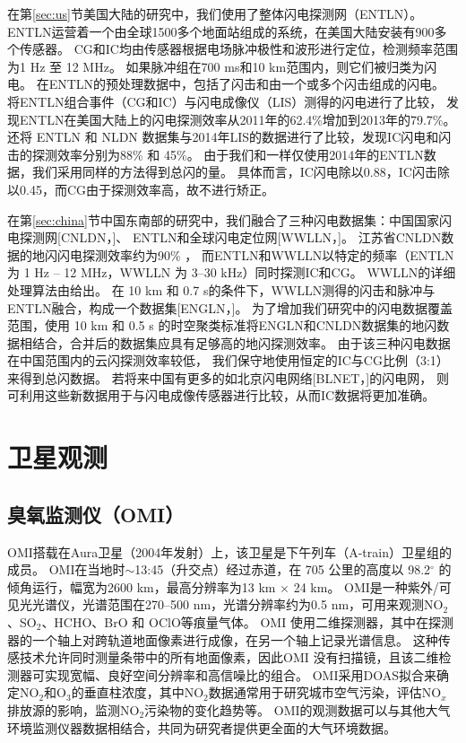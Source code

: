 在第\ref{sec:us}节美国大陆的研究中，我们使用了整体闪电探测网（ENTLN）。
ENTLN运营着一个由全球1500多个地面站组成的系统，在美国大陆安装有900多个传感器\citep{Zhu.2017,Marchand.2019}。
CG和IC均由传感器根据电场脉冲极性和波形进行定位，检测频率范围为1 Hz 至 12 MHz。
如果脉冲组在700 ms和10 km范围内，则它们被归类为闪电。
在ENTLN的预处理数据中，包括了闪击和由一个或多个闪击组成的闪电。
\citet{Rudlosky.2015}将ENTLN组合事件（CG和IC）与闪电成像仪（LIS）测得的闪电进行了比较，
发现ENTLN在美国大陆上的闪电探测效率从2011年的62.4\%增加到2013年的79.7\%。
\citet{Lapierre.2020}还将 ENTLN 和 NLDN 数据集与2014年LIS的数据进行了比较，发现IC闪电和闪击的探测效率分别为88\% 和 45\%。
由于我们和\citet{Lapierre.2020}一样仅使用2014年的ENTLN数据，我们采用同样的方法得到总闪的量。
具体而言，IC闪电除以0.88，IC闪击除以0.45，而CG由于探测效率高，故不进行矫正。

在第\ref{sec:china}节中国东南部的研究中，我们融合了三种闪电数据集：中国国家闪电探测网[CNLDN，\citet{Yang.2015}]、
ENTLN和全球闪电定位网[WWLLN，\citet{Rodger.2006}]。
江苏省CNLDN数据的地闪闪电探测效率约为90\% \citep{Li.2017a}，
而ENTLN和WWLLN以特定的频率（ENTLN 为 1 Hz -- 12 MHz，WWLLN 为 3--30 kHz）同时探测IC和CG。
WWLLN的详细处理算法由\citet{Rodger.2004}给出。
在 10 km 和 0.7 s的条件下，WWLLN测得的闪击和脉冲与ENTLN融合，构成一个数据集[ENGLN，\citet{Virts.2020b}]。
为了增加我们研究中的闪电数据覆盖范围，使用 10 km 和 0.5 s 的时空聚类标准将ENGLN和CNLDN数据集的地闪数据相结合\citep{Zhao.2020}，合并后的数据集应具有足够高的地闪探测效率。
由于该三种闪电数据在中国范围内的云闪探测效率较低，
我们保守地使用恒定的IC与CG比例（3:1）来得到总闪数据\citep{Wu.2016,Bandholnopparat.2020}。
若将来中国有更多的如北京闪电网络[BLNET，\citet{Srivastava.2017}]的闪电网，
则可利用这些新数据用于与闪电成像传感器进行比较\citep{Rudlosky.2013,Poelman.2020}，从而IC数据将更加准确。

\section{卫星观测}

\subsection{臭氧监测仪（OMI）}

OMI搭载在Aura卫星（2004年发射）上，该卫星是下午列车（A-train）卫星组的成员\citep{Levelt.2006,Levelt.2018}。
OMI在当地时$\sim$13:45（升交点）经过赤道，在 705 公里的高度以 98.2$^{\circ}$ 的倾角运行，幅宽为2600 km，最高分辨率为13 km $\times$ 24 km。
OMI是一种紫外/可见光光谱仪，光谱范围在270--500 nm，光谱分辨率约为0.5 nm，可用来观测NO$_2$、SO$_2$、HCHO、BrO 和 OClO等痕量气体。
OMI 使用二维探测器，其中在探测器的一个轴上对跨轨道地面像素进行成像，在另一个轴上记录光谱信息。 这种传感技术允许同时测量条带中的所有地面像素，因此OMI 没有扫描镜，且该二维检测器可实现宽幅、良好空间分辨率和高信噪比的组合。
OMI采用DOAS拟合来确定NO$_2$和O$_3$的垂直柱浓度，其中NO$_2$数据通常用于研究城市空气污染，评估NO$_x$排放源的影响，监测NO$_2$污染物的变化趋势等。
OMI的观测数据可以与其他大气环境监测仪器数据相结合，共同为研究者提供更全面的大气环境数据。

